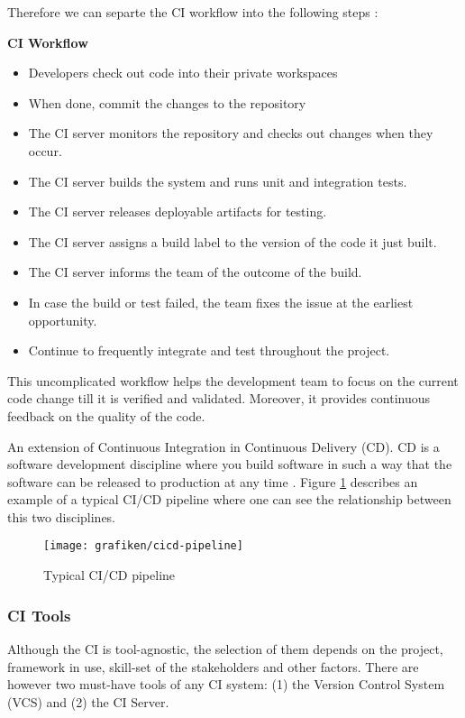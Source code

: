 Therefore we can separte the CI workflow into the following steps \cite{Fowler2006}:

\textbf{CI Workflow}

\begin{itemize}
\item Developers check out code into their private workspaces
\item When done, commit the changes to the repository
\item The CI server monitors the repository and checks out changes when they occur.
\item The CI server builds the system and runs unit and integration tests.
\item The CI server releases deployable artifacts for testing.
\item The CI server assigns a build label to the version of the code it just built.
\item The CI server informs the team of the outcome of the build.
\item In case the build or test failed, the team fixes the issue at the earliest opportunity.
\item Continue to frequently integrate and test throughout the project.
\end{itemize}

This uncomplicated workflow helps the development team to focus on the current code change till it is verified and validated. Moreover, it provides continuous feedback on the quality of the code.

An extension of Continuous Integration in Continuous Delivery (CD). CD is a software development discipline where you build software in such a way that the software can be released to production at any time \cite{Fowler2013}. Figure \ref{fig:cicdpipeline} describes an example of a typical CI/CD pipeline where one can see the relationship between this two disciplines.

\begin{figure}[ht]
	\centering
    \texttt{[image: grafiken/cicd-pipeline]}
    \caption{Typical CI/CD pipeline \cite{Chacon2009}}
    \label{fig:cicdpipeline}
\end{figure}

\subsubsection{CI Tools}

Although the CI is tool-agnostic, the selection of them depends on the project, framework in use, skill-set of the stakeholders and other factors. There are however two must-have tools of any CI system: (1) the Version Control System (VCS) and (2) the CI Server.

